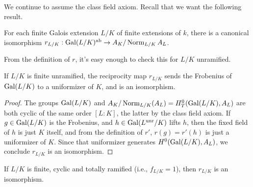 We continue to assume the class field axiom.
Recall that we want the following result.
\begin{theorem} \label{T:abstract reciprocity law}
For each finite Galois extension $L/K$ of finite extensions of $k$,
there is a canonical isomorphism $r_{L/K}: \operatorname{Gal}(L/K)^{\operatorname{ab}}
\to A_K / \operatorname{Norm}_{L/K} A_L$.
\end{theorem}
From the definition of $r$, it's easy enough to check this for
$L/K$ unramified.
\begin{prop}
  If $L/K$ is finite unramified, the reciprocity map
$r_{L/K}$ sends the Frobenius of $\operatorname{Gal}(L/K)$ to a uniformizer of $K$, and is
an isomorphism.
\end{prop}
\begin{proof}
The groups $\operatorname{Gal}(L/K)$ and $A_K/\operatorname{Norm}_{L/K}(A_L) = H^0_T(\operatorname{Gal}(L/K), A_L)$
are both cyclic of the same order $[L:K]$, the latter by the class field
axiom. If $g \in \operatorname{Gal}(L/K)$ is the Frobenius, and $h \in \operatorname{Gal}(L^{\operatorname{unr}}/K)$
lifts $h$, then the fixed field of $h$ is just $K$ itself, and 
from the definition of $r'$, $r(g) = r'(h)$ is just a uniformizer
of $K$. Since that uniformizer generates $H^0(\operatorname{Gal}(L/K), A_L)$, we conclude
$r_{L/K}$ is an isomorphism.
\end{proof}
\begin{prop}
  If $L/K$ is finite, cyclic and totally ramified (i.e., $f_{L/K} = 1$), then
$r_{L/K}$ is an isomorphism.
\end{prop}  
